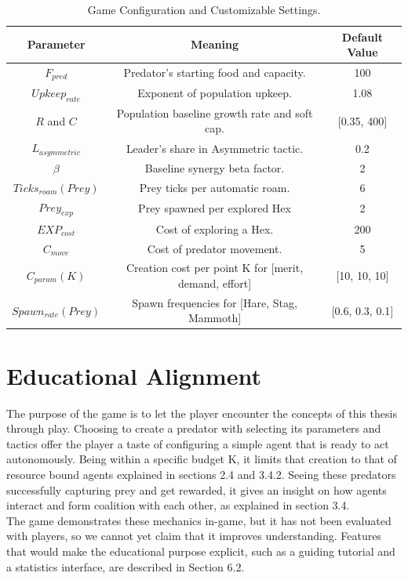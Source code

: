 \documentclass[12pt,a4paper]{report}
\begin{document}
	\begin{table}[H]
		\centering
		\begin{tabular}{|c|c|c|}
			\hline
			Parameter & Meaning & Default Value \\
			\hline
            $F_{pred}$ & Predator's starting food and capacity. & 100 \\
			$Upkeep_{rate}$ & Exponent of population upkeep. & 1.08 \\
			$R$ and $C$ & Population baseline growth rate and soft cap. & [0.35, 400] \\
			$L_{asymmetric}$ & Leader's share in Asymmetric tactic. & 0.2 \\
			$β$ & Baseline synergy beta factor. & 2 \\
			$Ticks_{roam}(Prey)$ & Prey ticks per automatic roam. & 6 \\
			$Prey_{exp}$ & Prey spawned per explored Hex & 2 \\
			$EXP_{cost}$ & Cost of exploring a Hex. & 200 \\
			$C_{move}$ & Cost of predator movement. & 5 \\
			$C_{param}(K)$ & Creation cost per point K for [merit, demand, effort] & [10, 10, 10] \\
			$Spawn_{rate}(Prey)$ & Spawn frequencies for [Hare, Stag, Mammoth] & [0.6, 0.3, 0.1] \\
			\hline
		\end{tabular}
		\caption{Game Configuration and Customizable Settings. }
	\end{table}

	\section{Educational Alignment}

	The purpose of the game is to let the player encounter the concepts of this thesis through play. Choosing to create a predator with selecting its parameters and tactics offer the player a taste of configuring a simple agent that is ready to act autonomously. Being within a specific budget K, it limits that creation to that of resource bound agents explained in sections 2.4 and 3.4.2. Seeing these predators successfully capturing prey and get rewarded, it gives an insight on how agents interact and form coalition with each other, as explained in section 3.4. \\ 

	The game demonstrates these mechanics in-game, but it has not been evaluated with players, so we cannot yet claim that it improves understanding. Features that would make the educational purpose explicit, such as a guiding tutorial and a statistics interface, are described in Section 6.2.
\end{document}
